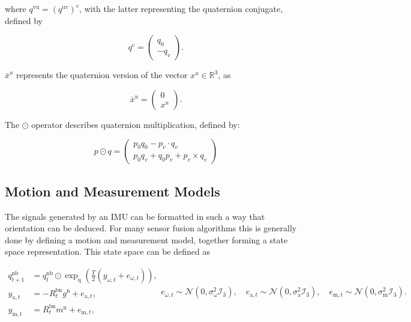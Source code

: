 where $q^{\mathrm{vu}} = \left(q^{\mathrm{uv}}\right)^{\mathrm{c}}$, with the latter representing the quaternion conjugate, defined by 

\begin{equation}
	\label{eq:quat_conjugate}
	q^{\mathrm{c}}=\left(\begin{array}{c}{q_{0}} \\ {-q_{v}}\end{array}\right).
\end{equation}

$\bar{x}^u$ represents the quaternion version of the vector $x^u \in \mathbb{R}^3$, as

\begin{equation}
	\label{eq:quat_vec_ref}
	\bar{x}^u=\left(\begin{array}{l}{0} \\ {x^u}\end{array}\right).
\end{equation}


The $\odot$ operator describes quaternion multiplication, defined by:

\begin{equation}
	\label{eq:quat_multiplication}
	p \odot q=\left(\begin{array}{c}{p_{0} q_{0}-p_{v} \cdot q_{v}} \\ {p_{0} q_{v}+q_{0} p_{v}+p_{v} \times q_{v}}\end{array}\right)
\end{equation}

\subsection{Motion and Measurement Models}
\label{sec:motion_and_measurement_models}
The signals generated by an IMU can be formatted in such a way that orientation can be deduced. For many sensor fusion algorithms this is generally done by defining a motion and measurement model, together forming a state space representation. This state space can be defined as \cite{Kok2017}

\begin{subequations}
	\begin{align}
		\label{eq:orient_dynamics}
		q_{t+1}^{\mathrm{nb}} &=q_{t}^{\mathrm{nb}} \odot \exp _{\mathrm{q}}\left(\frac{T}{2}\left(y_{\omega, t}+e_{\omega, t}\right)\right), 	\\ 
		\label{eq:orient_acc_measure}
		y_{\mathrm{a}, t} &=-R_{t}^{\mathrm{bn}} g^{\mathrm{n}}+e_{\mathrm{a}, t},\\ 
		\label{eq:orient_mag_measure}
		y_{\mathrm{m}, t} &=R_{t}^{\mathrm{bn}} m^{\mathrm{n}}+e_{\mathrm{m}, t}, 
	\end{align}
	\begin{equation}
		\label{eq:orient_ss_noise}
		e_{\omega, t} \sim \mathcal{N}\left(0, \sigma_{\mathrm{\omega}}^{2} \mathcal{I}_{3}\right), 
		\quad 
		e_{\mathrm{a}, t} \sim \mathcal{N}\left(0, \sigma_{\mathrm{a}}^{2} \mathcal{I}_{3}\right), 
		\quad 
		e_{\mathrm{m}, t} \sim \mathcal{N}\left(0, \sigma_{\mathrm{m}}^{2} \mathcal{I}_{3}\right).
	\end{equation}
	\label{eq:orient_state_space}
\end{subequations}

